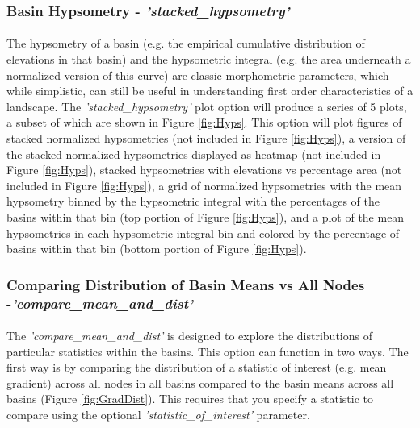 \subsubsection{Basin Hypsometry - \textit{'stacked\_hypsometry'}} \label{sec:hyps}
\paragraph{}The hypsometry of a basin (e.g. the empirical cumulative distribution of elevations in that basin) and the hypsometric integral (e.g. the area underneath a normalized version of this curve) are classic morphometric parameters, which while simplistic, can still be useful in understanding first order characteristics of a landscape. The \textit{'stacked\_hypsometry'} plot option will produce a series of 5 plots, a subset of which are shown in Figure \ref{fig:Hyps}. This option will plot figures of stacked normalized hypsometries (not included in Figure \ref{fig:Hyps}), a version of the stacked normalized hypsometries displayed as heatmap (not included in Figure \ref{fig:Hyps}), stacked hypsometries with elevations vs percentage area (not included in Figure \ref{fig:Hyps}), a grid of normalized hypsometries with the mean hypsometry binned by the hypsometric integral with the percentages of the basins within that bin (top portion of Figure \ref{fig:Hyps}), and a plot of the mean hypsometries in each hypsometric integral bin and colored by the percentage of basins within that bin (bottom portion of Figure \ref{fig:Hyps}).



\subsubsection{Comparing Distribution of Basin Means vs All Nodes -\textit{'compare\_mean\_and\_dist'}} \label{sec:meanANDdist}
\paragraph{}The \textit{'compare\_mean\_and\_dist'} is designed to explore the distributions of particular statistics within the basins. This option can function in two ways. The first way is by comparing the distribution of a statistic of interest (e.g. mean gradient) across all nodes in all basins compared to the basin means across all basins (Figure \ref{fig:GradDist}). This requires that you specify a statistic to compare using the optional \textit{'statistic\_of\_interest'} parameter.


